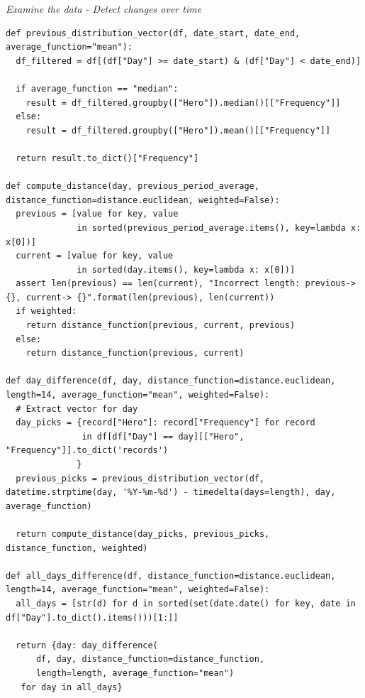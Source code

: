 \emph{Examine the data - Detect changes over time}
\begin{verbatim}
def previous_distribution_vector(df, date_start, date_end, average_function="mean"):
  df_filtered = df[(df["Day"] >= date_start) & (df["Day"] < date_end)]
  
  if average_function == "median":
    result = df_filtered.groupby(["Hero"]).median()[["Frequency"]]
  else:
    result = df_filtered.groupby(["Hero"]).mean()[["Frequency"]]
  
  return result.to_dict()["Frequency"]

def compute_distance(day, previous_period_average, distance_function=distance.euclidean, weighted=False):
  previous = [value for key, value 
              in sorted(previous_period_average.items(), key=lambda x: x[0])]
  current = [value for key, value 
              in sorted(day.items(), key=lambda x: x[0])]
  assert len(previous) == len(current), "Incorrect length: previous-> {}, current-> {}".format(len(previous), len(current))
  if weighted:
    return distance_function(previous, current, previous)
  else:
    return distance_function(previous, current)
  
def day_difference(df, day, distance_function=distance.euclidean, length=14, average_function="mean", weighted=False):
  # Extract vector for day
  day_picks = {record["Hero"]: record["Frequency"] for record 
               in df[df["Day"] == day][["Hero", "Frequency"]].to_dict('records')
              }
  previous_picks = previous_distribution_vector(df, datetime.strptime(day, '%Y-%m-%d') - timedelta(days=length), day, average_function)
  
  return compute_distance(day_picks, previous_picks, distance_function, weighted)

def all_days_difference(df, distance_function=distance.euclidean, length=14, average_function="mean", weighted=False):
  all_days = [str(d) for d in sorted(set(date.date() for key, date in df["Day"].to_dict().items()))[1:]]
  
  return {day: day_difference(
      df, day, distance_function=distance_function, 
      length=length, average_function="mean") 
   for day in all_days}
\end{verbatim}

